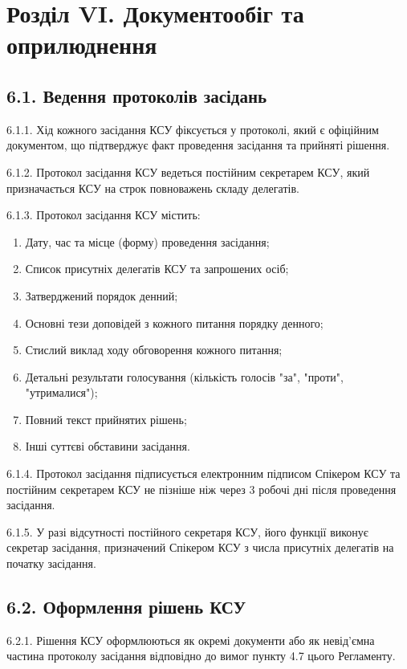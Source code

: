 \section*{Розділ VI. Документообіг та оприлюднення}

\subsection*{6.1. Ведення протоколів засідань}
    6.1.1. Хід кожного засідання КСУ фіксується у протоколі, який є офіційним документом, що підтверджує факт проведення засідання та прийняті рішення.

    6.1.2. Протокол засідання КСУ ведеться постійним секретарем КСУ, який призначається КСУ на строк повноважень складу делегатів.

    6.1.3. Протокол засідання КСУ містить:

        \begin{enumerate}[label=\alph*)]
            \item Дату, час та місце (форму) проведення засідання;
            \item Список присутніх делегатів КСУ та запрошених осіб;
            \item Затверджений порядок денний;
            \item Основні тези доповідей з кожного питання порядку денного;
            \item Стислий виклад ходу обговорення кожного питання;
            \item Детальні результати голосування (кількість голосів "за", "проти", "утрималися");
            \item Повний текст прийнятих рішень;
            \item Інші суттєві обставини засідання.
        \end{enumerate}

    6.1.4. Протокол засідання підписується електронним підписом Спікером КСУ та постійним секретарем КСУ не пізніше ніж через 3 робочі дні після проведення засідання.

    6.1.5. У разі відсутності постійного секретаря КСУ, його функції виконує секретар засідання, призначений Спікером КСУ з числа присутніх делегатів на початку засідання.

\subsection*{6.2. Оформлення рішень КСУ}
    6.2.1. Рішення КСУ оформлюються як окремі документи або як невід'ємна частина протоколу засідання відповідно до вимог пункту 4.7 цього Регламенту.

